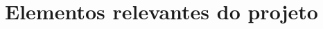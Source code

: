 \begin{comment}
\section{Rotinas de programação em economia}

Em economia, é comum o uso de \textit{softwares} dedicados à determinadas tarefas acadêmicas. No entanto, cada vez mais são utilizadas linguagens de programação nas mais diferentes áreas de conhecimento. O desenvolvimento de rotinas de programação possibilita uma maior autonomia do pesquisador para resolver problemas específicos e assim avançar na linha de pesquisa. Além disso, a distribuição dos programas criados pode contribuir para o avanço de outras fronteiras de pesquisa de forma mais difusa.

\end{comment}


\begin{comment}
\end{comment}



\section{Elementos relevantes do projeto}\label{relev}

